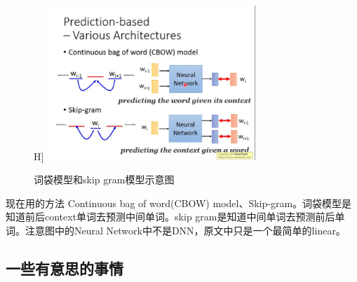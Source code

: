 \documentclass{article}
\begin{document}
\begin{itemize}
    \begin{figure}H]
        \centering %
        \includegraphics[width=0.7\textwidth]{fig/cbow_and_skip.png} %
        \caption{词袋模型和skip gram模型示意图} %
        \label{cbow_and_skip} %
    \end{figure}
现在用的方法 Continuous bag of word(CBOW) model、Skip-gram。词袋模型是知道前后context单词去预测中间单词。skip gram是知道中间单词去预测前后单词。注意图中的Neural Network中不是DNN，原文中只是一个最简单的linear。
\end{itemize}
\subsection{一些有意思的事情}
\end{document}
